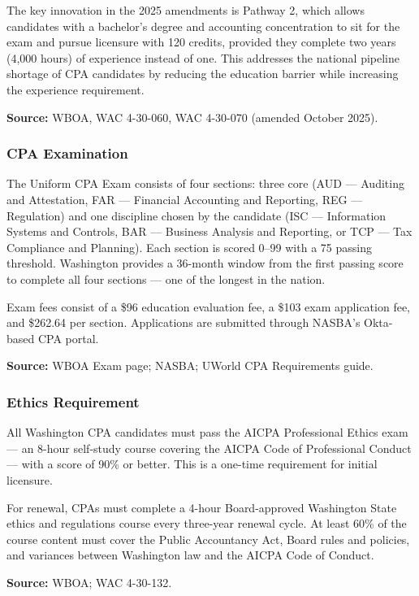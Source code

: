 \documentclass[11pt,letterpaper]{article}
\begin{document}
The key innovation in the 2025 amendments is Pathway 2, which allows candidates with a bachelor's degree and accounting concentration to sit for the exam and pursue licensure with 120 credits, provided they complete two years (4,000 hours) of experience instead of one. This addresses the national pipeline shortage of CPA candidates by reducing the education barrier while increasing the experience requirement.

\textbf{Source:} WBOA, WAC 4-30-060, WAC 4-30-070 (amended October 2025).

\subsubsection{CPA Examination}

The Uniform CPA Exam consists of four sections: three core (AUD --- Auditing and Attestation, FAR --- Financial Accounting and Reporting, REG --- Regulation) and one discipline chosen by the candidate (ISC --- Information Systems and Controls, BAR --- Business Analysis and Reporting, or TCP --- Tax Compliance and Planning). Each section is scored 0--99 with a 75 passing threshold. Washington provides a 36-month window from the first passing score to complete all four sections --- one of the longest in the nation.

Exam fees consist of a \$96 education evaluation fee, a \$103 exam application fee, and \$262.64 per section. Applications are submitted through NASBA's Okta-based CPA portal.

\textbf{Source:} WBOA Exam page; NASBA; UWorld CPA Requirements guide.

\subsubsection{Ethics Requirement}

All Washington CPA candidates must pass the AICPA Professional Ethics exam --- an 8-hour self-study course covering the AICPA Code of Professional Conduct --- with a score of 90\% or better. This is a one-time requirement for initial licensure.

For renewal, CPAs must complete a 4-hour Board-approved Washington State ethics and regulations course every three-year renewal cycle. At least 60\% of the course content must cover the Public Accountancy Act, Board rules and policies, and variances between Washington law and the AICPA Code of Conduct.

\textbf{Source:} WBOA; WAC 4-30-132.
\end{document}
